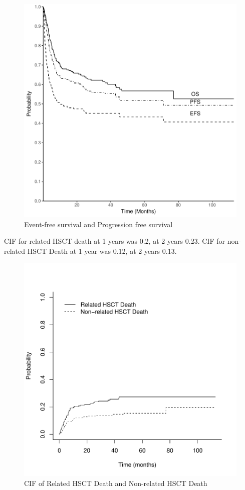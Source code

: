 \documentclass[a4paper,11pt] {article}
\begin{document}
\begin{figure}[h]
\begin{center}
\includegraphics{Rapport-fig2}
\end{center}
\caption{Event-free survival and Progression free survival}
\label{fig2}
\end{figure}



\pagebreak
CIF for related HSCT death at 1 years was 0.2, at 2 years  0.23.
CIF for non-related HSCT Death at 1 year was 0.12, at 2 years  0.13.
\begin{figure}[h]
\begin{center}
\includegraphics{Rapport-fig5}
\end{center}
\caption{CIF of Related HSCT Death and Non-related HSCT Death}
\label{fig5}
\end{figure}
\end{document}
